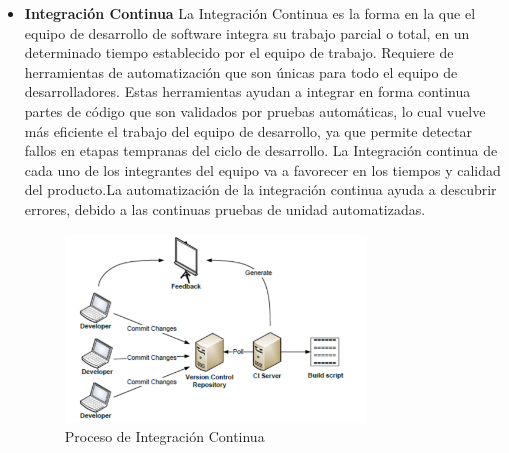 \documentclass[preprint,12pt]{elsarticle}
\begin{document}
\begin{itemize}

\item \textbf{Integración Continua}
La Integración Continua es la forma en la que el equipo de desarrollo de software integra su trabajo parcial o total, en un determinado tiempo establecido por el equipo de trabajo. Requiere de herramientas de automatización que son únicas para todo el equipo de desarrolladores. Estas herramientas ayudan a integrar en forma continua partes de código que son validados por pruebas automáticas, lo cual vuelve más eficiente el trabajo del equipo de desarrollo, ya que permite detectar fallos en etapas tempranas del ciclo de desarrollo.
La Integración continua de cada uno de los integrantes del equipo va a favorecer en los tiempos y calidad del producto.La automatización de la integración continua ayuda a descubrir errores, debido a las continuas pruebas de unidad automatizadas. 
\begin{figure}[htb]
	\begin{center}
		\includegraphics[width=8cm]{./IMAGENES/proceso_integracion_continua} 
		\caption{Proceso de Integración Continua}
	\end{center}
\end{figure}



\end{itemize}
\end{document}
